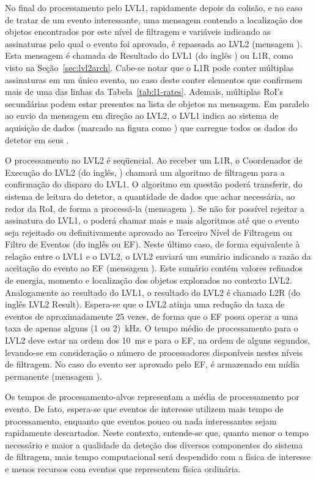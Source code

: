No final do processamento pelo LVL1, rapidamente depois da colisão, e no caso
de tratar de um evento interessante, uma mensagem contendo a localização dos
objetos encontrados por este nível de filtragem e variáveis indicando as
assinaturas pelo qual o evento foi aprovado, é repassada ao LVL2
(mensagem ). Esta mensagem é chamada de Resultado do LVL1 (do inglês
) ou L1R, como visto na Seção~\ref{sec:lvl2arch}. Cabe-se
notar que o L1R pode conter múltiplas assinaturas em um único evento, no caso
deste conter elementos que confirmem mais de uma das linhas da
Tabela~\ref{tab:l1-rates}. Ademais, múltiplas RoI's secundárias podem estar
presentes na lista de objetos na mensagem. Em paralelo ao envio da mensagem em
direção ao LVL2, o LVL1 indica ao sistema de aquisição de dados (marcado na
figura como ) que carregue todos os dados do detetor em seus
.

O processamento no LVL2 é seqüencial. Ao receber um L1R, o Coordenador de
Execução do LVL2 (do inglês, ) chamará um algoritmo de filtragem
para a confirmação do disparo do LVL1. O algoritmo em questão poderá
transferir, do sistema de leitura do detetor, a quantidade de dados que achar
necessária, ao redor da RoI, de forma a processá-la (mensagem ). Se
não for possível rejeitar a assinatura do LVL1, o  poderá chamar
mais e mais algoritmos até que o evento seja rejeitado ou definitivamente
aprovado ao Terceiro Nível de Filtragem ou Filtro de Eventos (do inglês
 ou EF). Neste último caso, de forma equivalente à relação
entre o LVL1 e o LVL2, o LVL2 enviará um sumário indicando a razão da
aceitação do evento ao EF (mensagem ). Este sumário contém valores
refinados de energia, momento e localização dos objetos explorados no contexto
LVL2. Analogamente ao resultado do LVL1, o resultado do LVL2 é chamado L2R (do
inglês {LVL2 Result}). Espera-se que o LVL2 atinja uma redução da taxa de
eventos de aproximadamente 25 vezes, de forma que o EF possa operar a uma taxa
de apenas alguns (1 ou 2)~kHz. O tempo médio de processamento para o LVL2 deve
estar na ordem dos 10~ms e para o EF, na ordem de alguns segundos, levando-se
em consideração o número de processadores disponíveis nestes níveis de
filtragem. No caso do evento ser aprovado pelo EF, é armazenado em mídia
permanente (mensagem
).

Os tempos de processamento-alvos representam a média de processamento por
evento. De fato, espera-se que eventos de interesse utilizem mais tempo de
processamento, enquanto que eventos pouco ou nada interessantes sejam
rapidamente descartados. Neste contexto, entende-se que, quanto menor o tempo
necessário e maior a qualidade da deteção dos diversos componentes do sistema
de filtragem, mais tempo computacional será despendido com a física de
interesse e menos recursos com eventos que representem física ordinária.

